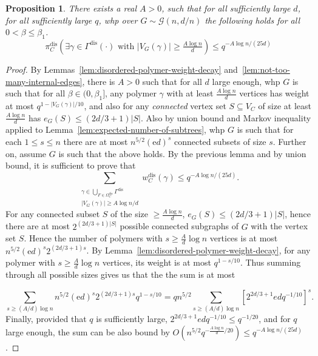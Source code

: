\documentclass[11pt]{article}
\theoremstyle{plain}
\newtheorem{proposition}[theorem]{Proposition}
\newcommand{\G}{\mathcal{G}}
\newcommand{\emm}{\mathrm{e}}
\newcommand{\1}{\mathbb{1}}
\newcommand{\dis}{\mathrm{dis}}
\begin{document}
\begin{proposition}\label{prop:disordered-kotecky-preiss}
    There exists a real \(A > 0\), such that for all sufficiently large \(d\), for all sufficiently large \(q\), whp over \(G\sim\G(n,d/n)\) the following holds for all \(0 < \beta \leq \beta_1\).
    \[\pi^\dis_C(\exists\gamma\in\Gamma^\dis(\cdot)\text{ with }|V_G(\gamma)|\geq\tfrac{A\log n}{d}) \leq q^{-A\log n/(25d)}
    \]
\end{proposition}
\begin{proof}
    By Lemmas~\ref{lem:disordered-polymer-weight-decay} and~\ref{lem:not-too-many-internal-edges}, there is \(A > 0\) such that for all \(d\) large enough, whp \(G\) is such that for all \(\beta\in(0,\beta_1]\), any polymer \(\gamma\) with at least \(\frac{A\log n}{d}\) vertices has weight at most \(q^{1-|V_G(\gamma)|/10}\), and also for any \textit{connected} vertex set \(S\subseteq V_C\) of size at least \(\frac{A\log n}{d}\) has \(e_G(S)\leq (2d/3+1)|S|\). Also by union bound and Markov inequality applied to Lemma~\ref{lem:expected-number-of-subtrees}, whp \(G\) is such that for each \(1\leq s\leq n\) there are at most \(n^{5/2}(\emm d)^s\) connected subsets of size \(s\). Further on, assume \(G\) is such that the above holds.    By the previous lemma and by union bound, it is sufficient to prove that    
    \[
\sum_{\substack{\gamma\in\bigcup_{F\in\Omega_C^\dis}\Gamma^\dis\\|V_G(\gamma)|\geq A\log n/d}} w^\dis_C(\gamma) \leq  q^{-A\log n/(25d)}.
    \]
    For any connected subset \(S\) of the size \(\geq\frac{A\log n}{d}\), \(e_G(S)\leq (2d/3+1)|S|\), hence there are at most \(2^{(2d/3+1)|S|}\) possible connected subgraphs of \(G\) with the vertex set \(S\). Hence the number of polymers with \(s\geq\frac{A}{d}\log n\) vertices is at most \(n^{5/2}(\emm d)^s 2^{(2d/3+1)s}\). 
    By Lemma~\ref{lem:disordered-polymer-weight-decay}, for any polymer with \(s\geq\frac{A}{d}\log n\) vertices, its weight is at most \(q^{1-s/10}\). Thus summing through all possible sizes gives us that the the sum is at most

    \[
    \sum_{s\geq (A/d)\log n} n^{5/2}(\emm d)^s 2^{(2d/3+1)s} q^{1-s/10} = qn^{5/2} \sum_{s\geq (A/d)\log n} [2^{2d/3+1}edq^{-1/10}]^s.
    \]
    Finally, provided that \(q\) is sufficiently large, \(2^{2d/3+1}edq^{-1/10} \leq q^{-1/20}\), and for \(q\) large enough, the sum can be also bound by \(O(n^{5/2} q^{-\frac{A \log n}{d} / 20}) \leq  q^{-A\log n/(25d)}\).
\end{proof}
\end{document}
